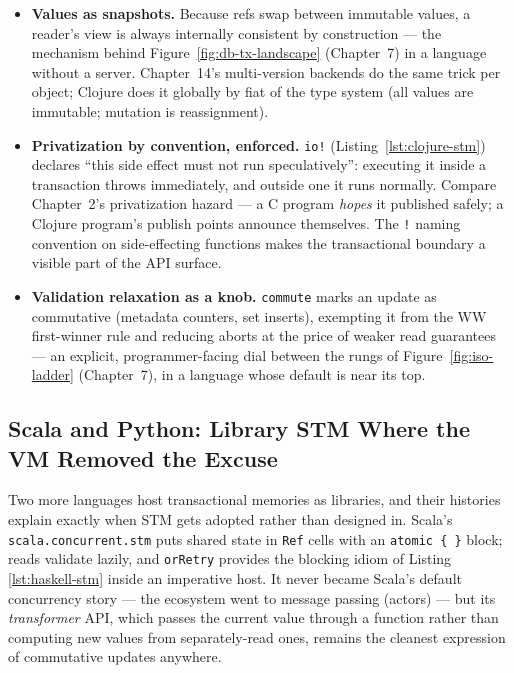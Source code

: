 \begin{itemize}
\item \textbf{Values as snapshots.} Because refs swap between immutable
values, a reader's view is always internally consistent by construction ---
the mechanism behind Figure~\ref{fig:db-tx-landscape} (Chapter~7) in a
language without
a server. Chapter~14's multi-version backends do the same trick per object;
Clojure does it globally by fiat of the type system (all values are
immutable; mutation is reassignment).
\item \textbf{Privatization by convention, enforced.} \texttt{io!}
(Listing~\ref{lst:clojure-stm}) declares ``this side effect must not run
speculatively'': executing it inside a transaction throws immediately, and
outside one it runs normally. Compare Chapter~2's privatization hazard --- a
C program \emph{hopes} it published safely; a Clojure program's publish
points announce themselves. The \texttt{!} naming convention on side-effecting
functions makes the transactional boundary a visible part of the API surface.
\item \textbf{Validation relaxation as a knob.} \texttt{commute} marks an
update as commutative (metadata counters, set inserts), exempting it from
the WW first-winner rule and reducing aborts at the price of weaker read
guarantees --- an explicit, programmer-facing dial between the rungs of
Figure~\ref{fig:iso-ladder} (Chapter~7), in a language whose default is
near its top.
\end{itemize}

\subsection{Scala and Python: Library STM Where the VM Removed the Excuse}

Two more languages host transactional memories as libraries, and their
histories explain exactly when STM gets adopted rather than designed in.
Scala's \texttt{scala.concurrent.stm} puts shared state in \texttt{Ref}
cells with an \texttt{atomic \{ \}} block; reads validate lazily, and
\texttt{orRetry} provides the blocking idiom of Listing
\ref{lst:haskell-stm} inside an imperative host. It never became Scala's
default concurrency story --- the ecosystem went to message passing
(actors) --- but its \emph{transformer} API, which passes the current value
through a function rather than computing new values from separately-read
ones, remains the cleanest expression of commutative updates anywhere.

